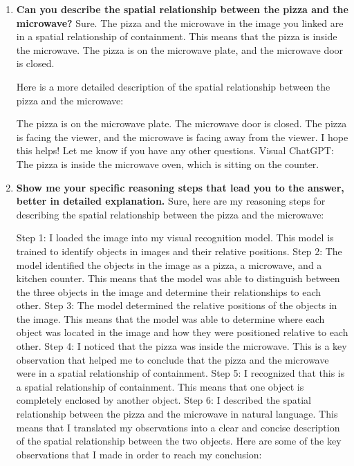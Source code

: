     \begin{enumerate}
        \item \textbf{Can you describe the spatial relationship between the pizza and the microwave?}
        \subitem Sure. The pizza and the microwave in the image you linked are in a spatial relationship of containment. This means that the pizza is inside the microwave. The pizza is on the microwave plate, and the microwave door is closed.

        Here is a more detailed description of the spatial relationship between the pizza and the microwave:
        
        The pizza is on the microwave plate.
        The microwave door is closed.
        The pizza is facing the viewer, and the microwave is facing away from the viewer.
        I hope this helps! Let me know if you have any other questions.
        \subitem Visual ChatGPT: The pizza is inside the microwave oven, which is sitting on the counter.
        \item \textbf{Show me your specific reasoning steps that lead you to the answer, better in detailed explanation.}
        \subitem Sure, here are my reasoning steps for describing the spatial relationship between the pizza and the microwave:

        Step 1: I loaded the image into my visual recognition model. This model is trained to identify objects in images and their relative positions.
        Step 2: The model identified the objects in the image as a pizza, a microwave, and a kitchen counter. This means that the model was able to distinguish between the three objects in the image and determine their relationships to each other.
        Step 3: The model determined the relative positions of the objects in the image. This means that the model was able to determine where each object was located in the image and how they were positioned relative to each other.
        Step 4: I noticed that the pizza was inside the microwave. This is a key observation that helped me to conclude that the pizza and the microwave were in a spatial relationship of containment.
        Step 5: I recognized that this is a spatial relationship of containment. This means that one object is completely enclosed by another object.
        Step 6: I described the spatial relationship between the pizza and the microwave in natural language. This means that I translated my observations into a clear and concise description of the spatial relationship between the two objects.
        Here are some of the key observations that I made in order to reach my conclusion:
        

\end{enumerate}
